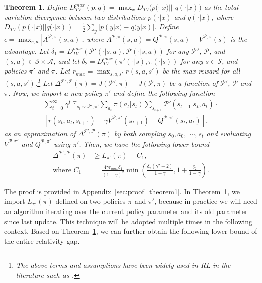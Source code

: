 \documentclass[letterpaper]{article} %
\def\E{{\mathbb{E}}}
\def\P{{\mathcal{P}}}
\def\A{{\mathcal{A}}}
\def\S{{\mathcal{S}}}
\newtheorem{theorem}{Theorem}%
\begin{document}
\begin{theorem}
\label{theo:2}
Define $D_{TV}^{max}(p,q)=\max_{x}D_{TV}(p(\cdot|x)||$ $q(\cdot|x))$ as the total variation divergence between two distributions $p(\cdot|x)$ and $q(\cdot|x)$,
where $D_{TV}(p(\cdot|x)||q(\cdot|x))=\frac{1}{2}\sum_{y}|p(y|x)-q(y|x)|$.
Define $\epsilon=\max_{s,a}|A^{\P,\pi}(s,a)|$, where $A^{\P,\pi}(s,a)=Q^{\P,\pi}(s,a)-V^{\P,\pi}(s)$ is the advantage.
Let $\delta_1=D_{TV}^{max}(\P'(\cdot|s,a),\P(\cdot|s,a))$
for any $\P'$, $\P$, and $(s,a)\in\S\times\A$, and let
$\delta_2=D_{TV}^{max}(\pi'(\cdot|s),\pi(\cdot|s))$
for any $s\in\S$, and policies $\pi'$ and $\pi$. Let $r_{max}=\max_{s,a,s'}r(s,a,s')$ be the max reward for all $(s,a,s')$.\footnote{The above terms and assumptions have been widely used in RL in the literature such as \citep{kakade2002,schulman2015trust,luo2018algorithmic,janner2019trust}.}
Let $\Delta^{\P',\P}(\pi)=J(\P',\pi)-J(\P,\pi)$ be a function of $\P'$, $\P$ and $\pi$.
Now, we import a new policy $\pi'$ and define the following function
{\small
\begin{align}
\sum_{t=0}^{\infty}\gamma^t\
\E_{s_t\sim \P',\pi'}
\sum_{a_t}\pi(a_t|s_t)
\sum_{s_{t+1}}\P'(s_{t+1}|s_t,a_t)  \cdot \nonumber \\
\left[
r(s_t,a_t,s_{t+1})+\gamma V^{\P, \pi'}(s_{t+1}) - Q^{\P, {\pi'}}(s_t,a_t)
\right],
\end{align}
}as an approximation of $\Delta^{\P',\P}(\pi)$ by both sampling $s_0,a_0,$ $\cdots,s_t$ and evaluating $V^{\P,\pi'}$ and $Q^{\P,\pi'}$ using $\pi'$. Then, we have the following lower bound
{\small
\begin{equation}
\begin{aligned}
\Delta^{\P',\P}(\pi)&\geq L_{\pi'}(\pi)-C_1, \\
\text{where }
C_1&=\frac{4\gamma r_{max}\delta_1}{(1-\gamma)^2}
\min\left(
\frac{\delta_2(\gamma^2+2)}{1-\gamma}, 1+\frac{\delta_2}{1-\gamma}
\right).
\label{eq:lower}
\end{aligned}
\end{equation}
}
\end{theorem}
The proof is provided in Appendix~\ref{sec:proof_theorem1}. In Theorem~\ref{theo:2}, we import $L_{\pi'}(\pi)$ defined on two policies $\pi$ and $\pi'$, because in practice we will need an algorithm iterating over the current policy parameter and its old parameter since last update. This technique will be adopted multiple times in the following context. Based on Theorem~\ref{theo:2}, we can further obtain the following lower bound of the entire relativity gap.
\end{document}
